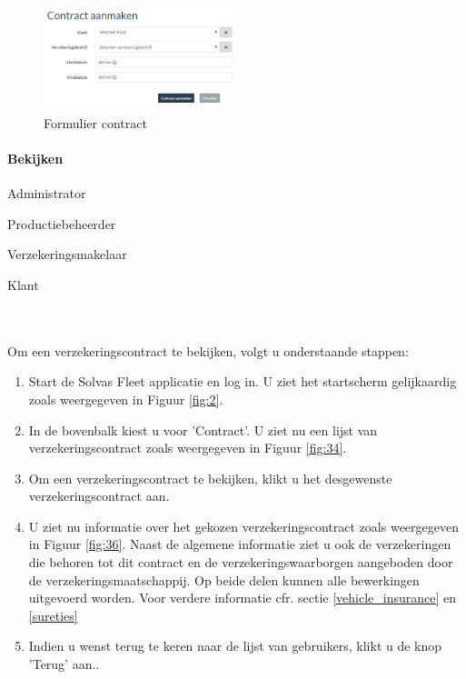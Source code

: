 \documentclass[11pt,openany]{article}
\newcommand{\cmark}{\ding{51}}%
\newcommand{\xmark}{\ding{55}}%
\newcommand{\done}{\rlap{$\square$}{\raisebox{2pt}{\large\hspace{1pt}\cmark}}%
	\hspace{-2.5pt}}
\newcommand{\wontfix}{\rlap{$\square$}{\large\hspace{1pt}\xmark}}
\begin{document}
\begin{figure}
	\centering
	\includegraphics[width=0.5\textwidth]{img/fig35.png}
	\caption{Formulier contract} 
	\label{fig:35} 
\end{figure}

\paragraph{Bekijken}
\label{contract_show}
\begin{todolist}
	\item[\done] Administrator
	\item[\done] Productiebeheerder
	\item[\done] Verzekeringsmakelaar
	\item[\wontfix] Klant 
\end{todolist}
\\
\\
Om een verzekeringscontract te bekijken, volgt u onderstaande stappen:
\begin{enumerate}
	\item Start de Solvas Fleet applicatie en log in. U ziet het startscherm gelijkaardig zoals weergegeven in Figuur \ref{fig:2}.
	\item In de bovenbalk kiest u voor 'Contract'. U ziet nu een lijst van verzekeringscontract zoals weergegeven in Figuur \ref{fig:34}.
	\item Om een verzekeringscontract te bekijken, klikt u het desgewenste verzekeringscontract aan.
	\item U ziet nu informatie over het gekozen verzekeringscontract zoals weergegeven in Figuur \ref{fig:36}. 
	Naast de algemene informatie ziet u ook de verzekeringen die behoren tot dit contract en de verzekeringswaarborgen aangeboden door de verzekeringsmaatschappij. Op beide delen kunnen alle bewerkingen uitgevoerd worden. Voor verdere informatie cfr. sectie \ref{vehicle_insurance} en \ref{sureties}
	\item Indien u wenst terug te keren naar de lijst van gebruikers, klikt u de knop 'Terug' aan..
\end{enumerate}
\end{document}
